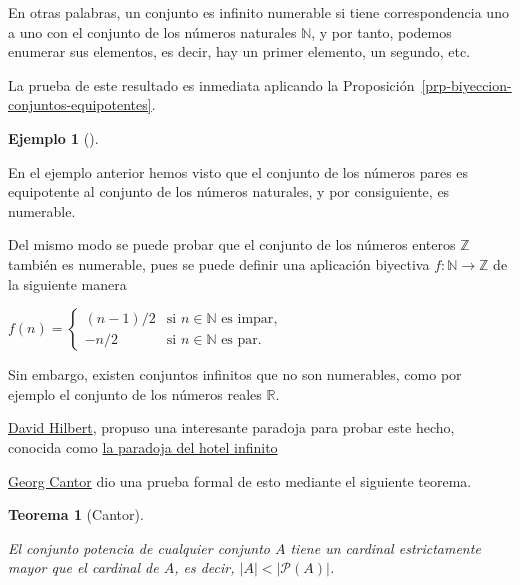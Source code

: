 \documentclass[
  a4paper,
]{scrreport}
\theoremstyle{definition}
\newtheorem{example}{Ejemplo}[chapter]
\theoremstyle{plain}
\theoremstyle{plain}
\newtheorem{theorem}{Teorema}[chapter]
\theoremstyle{definition}
\theoremstyle{plain}
\theoremstyle{remark}
\begin{document}
En otras palabras, un conjunto es infinito numerable si tiene
correspondencia uno a uno con el conjunto de los números naturales
\(\mathbb{N}\), y por tanto, podemos enumerar sus elementos, es decir,
hay un primer elemento, un segundo, etc.

La prueba de este resultado es inmediata aplicando la
Proposición~\ref{prp-biyeccion-conjuntos-equipotentes}.

\begin{example}[]\protect\hypertarget{exm-enteros-equipotentes-naturales}{}\label{exm-enteros-equipotentes-naturales}

En el ejemplo anterior hemos visto que el conjunto de los números pares
es equipotente al conjunto de los números naturales, y por consiguiente,
es numerable.

Del mismo modo se puede probar que el conjunto de los números enteros
\(\mathbb{Z}\) también es numerable, pues se puede definir una
aplicación biyectiva \(f:\mathbb{N}\rightarrow \mathbb{Z}\) de la
siguiente manera

\(f(n)= \begin{cases} (n-1)/2 &\mbox{si } n\in \mathbb{N} \mbox{ es impar},\\ -n/2 &\mbox{si } n\in \mathbb{N} \mbox{ es par}. \end{cases}\)

\end{example}

Sin embargo, existen conjuntos infinitos que no son numerables, como por
ejemplo el conjunto de los números reales \(\mathbb{R}\).

\href{https://es.wikipedia.org/wiki/David_Hilbert}{David Hilbert},
propuso una interesante paradoja para probar este hecho, conocida como
\href{https://www.youtube.com/watch?v=4c8vG-mxuao}{la paradoja del hotel
infinito}

\href{https://en.wikipedia.org/wiki/Georg_Cantor}{Georg Cantor} dio una
prueba formal de esto mediante el siguiente teorema.

\begin{theorem}[Cantor]\protect\hypertarget{thm-cantor}{}\label{thm-cantor}

El conjunto potencia de cualquier conjunto \(A\) tiene un cardinal
estrictamente mayor que el cardinal de \(A\), es decir,
\(|A| < |\mathcal{P}(A)|\).

\end{theorem}
\end{document}

